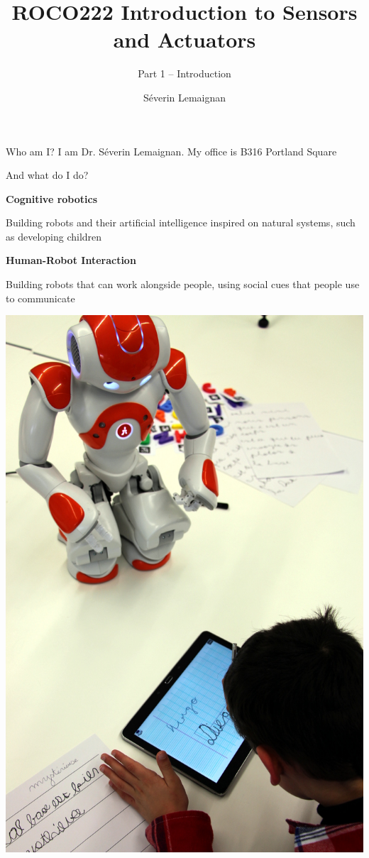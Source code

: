 \documentclass[compress]{beamer}
\title{ROCO222 \newline Introduction to Sensors and Actuators}
\subtitle{Part 1 -- Introduction}
\date{}
\author{Séverin Lemaignan}
\institute{Centre for Neural Systems and Robotics\\{\bf Plymouth University}}
\begin{document}

\maketitle

\begin{frame}{Who am I?}
    I am Dr. Séverin Lemaignan. My office is B316 Portland Square
\end{frame}

\begin{frame}{And what do I do?}

\begin{multicols}{2}

    \textbf{Cognitive robotics}

  Building robots and their artificial intelligence inspired on natural
  systems, such as developing children

    \textbf{Human-Robot Interaction}

  Building robots that can work alongside people, using social cues that
  people use to communicate

    \begin{center}
        \includegraphics[width=0.8\linewidth]{cowriter}
    \end{center}

\end{multicols}
\end{frame}
\end{document}
